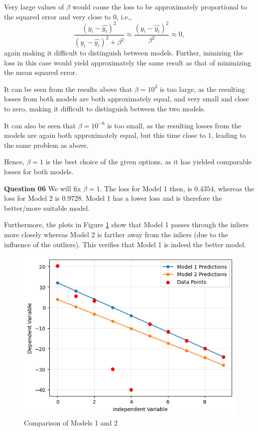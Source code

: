 \documentclass{article}[a4paper]
\begin{document}
	Very large values of $\beta$ would cause the loss to be approximately proportional to the squared error and
	very close to $0$, i.e., \[
		\dfrac{\left( y_i - \hat{y_i} \right)^2}{\left( y_i - \hat{y_i} \right)^2 + \beta^2}
		\approx
		\dfrac{\left( y_i - \hat{y_i} \right)^2}{\beta^2}
		\approx
		0,
	\] again making it difficult to distinguish between models. Further, inimizing the loss in this
	case would yield approximately the same result as that of minimizing the mean squared error.
	\newline

	It can be seen from the results above that $\beta = 10^3$ is too large, as the resulting losses from both
	models are both approximately equal, and very small and close to zero, making it difficult to distinguish
	between the two models.
	\newline

	It can also be seen that $\beta = 10^{-6}$ is too small, as the resulting losses from the models are again both
	approximately equal, but this time close to $1$, leading to the same problem as above.
	\newline

	Hence, $\beta = 1$ is the best choice of the given options, as it has yielded comparable losses for both
	models.
	\newline

	\textbf{Question 06} We will fix $\beta = 1$. The loss for Model 1 then, is $0.4354$, whereas the loss
	for Model 2 is $0.9728$. Model 1 has a lower loss and is therefore the better/more suitable model.
	\newline

	Furthermore, the plots in Figure \ref{q1_4_img} show that Model 1 passes through the inliers more closely whereas Model 2 is farther away
	from the inliers (due to the influence of the outliers). This verifies that Model 1 is indeed the better model.

	\begin{figure}[H]
		\centering
		\includegraphics[width=0.9\linewidth]{images/q1_4.png}
		\caption{Comparison of Models 1 and 2}
		\label{q1_4_img}
	\end{figure}
\end{document}
